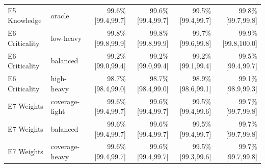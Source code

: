 \begin{table}[t]
{\begin{tabular}{llrrrr}
E5 Knowledge & oracle & 99.6\% [99.4,99.7] & 99.6\% [99.4,99.7] & 99.5\% [99.4,99.7] & 99.8\% [99.7,99.8] \\
E6 Criticality & low-heavy & 99.8\% [99.8,99.9] & 99.8\% [99.8,99.9] & 99.7\% [99.6,99.8] & 99.9\% [99.8,100.0] \\
E6 Criticality & balanced & 99.2\% [99.0,99.4] & 99.2\% [99.0,99.4] & 99.2\% [99.1,99.4] & 99.5\% [99.4,99.7] \\
E6 Criticality & high-heavy & 98.7\% [98.4,99.0] & 98.7\% [98.4,99.0] & 98.9\% [98.6,99.1] & 99.1\% [98.9,99.3] \\
E7 Weights & coverage-light & 99.6\% [99.4,99.7] & 99.6\% [99.4,99.7] & 99.5\% [99.4,99.6] & 99.7\% [99.7,99.8] \\
E7 Weights & balanced & 99.6\% [99.4,99.7] & 99.6\% [99.4,99.7] & 99.5\% [99.4,99.7] & 99.7\% [99.7,99.8] \\
E7 Weights & coverage-heavy & 99.6\% [99.4,99.7] & 99.6\% [99.4,99.7] & 99.5\% [99.3,99.6] & 99.7\% [99.7,99.8] \\
\bottomrule
\end{tabular}
}
\end{table}

